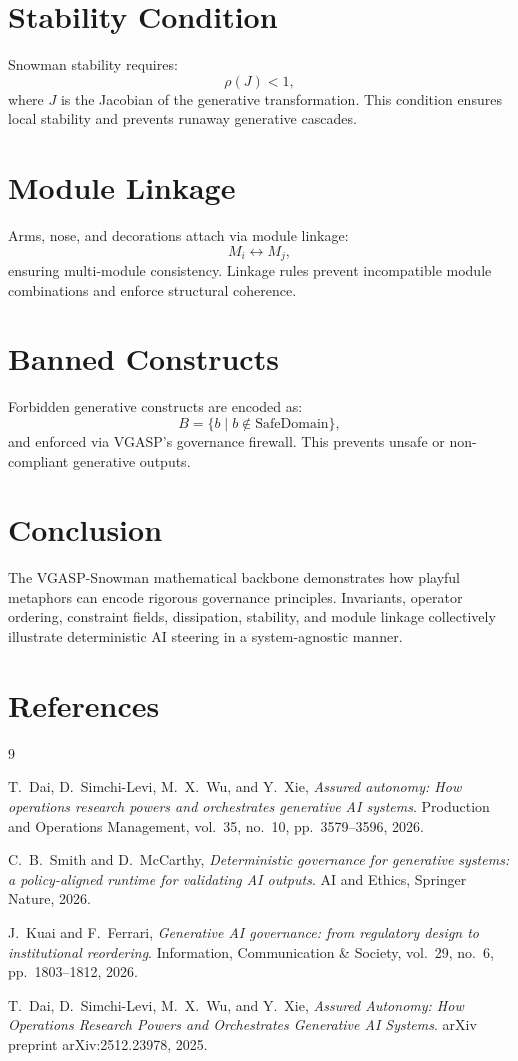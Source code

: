 \documentclass{article}
\begin{document}
\section{Stability Condition}
Snowman stability requires:
\[
\rho(J) < 1,
\]
where \( J \) is the Jacobian of the generative transformation. This condition
ensures local stability and prevents runaway generative cascades.

\section{Module Linkage}
Arms, nose, and decorations attach via module linkage:
\[
M_i \leftrightarrow M_j,
\]
ensuring multi-module consistency. Linkage rules prevent incompatible module
combinations and enforce structural coherence.

\section{Banned Constructs}
Forbidden generative constructs are encoded as:
\[
B = \{ b \mid b \notin \text{SafeDomain} \},
\]
and enforced via VGASP’s governance firewall. This prevents unsafe or
non-compliant generative outputs.

\section{Conclusion}
The VGASP-Snowman mathematical backbone demonstrates how playful metaphors can
encode rigorous governance principles. Invariants, operator ordering,
constraint fields, dissipation, stability, and module linkage collectively
illustrate deterministic AI steering in a system-agnostic manner.

\section{References}

\begin{thebibliography}{9}

T.~Dai, D.~Simchi-Levi, M.~X.~Wu, and Y.~Xie,
\textit{Assured autonomy: How operations research powers and orchestrates generative AI systems}.
Production and Operations Management, vol.~35, no.~10, pp.~3579–3596, 2026.

C.~B.~Smith and D.~McCarthy,
\textit{Deterministic governance for generative systems: a policy-aligned runtime for validating AI outputs}.
AI and Ethics, Springer Nature, 2026.

J.~Kuai and F.~Ferrari,
\textit{Generative AI governance: from regulatory design to institutional reordering}.
Information, Communication \& Society, vol.~29, no.~6, pp.~1803–1812, 2026.

T.~Dai, D.~Simchi-Levi, M.~X.~Wu, and Y.~Xie,
\textit{Assured Autonomy: How Operations Research Powers and Orchestrates Generative AI Systems}.
arXiv preprint arXiv:2512.23978, 2025.

\end{thebibliography}
\end{document}
